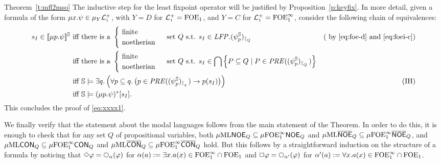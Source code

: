 \begin{proofof}{Theorem~\ref{t:mfl2mso}}
The inductive step for the least fixpoint operator will be justified by 
Proposition~\ref{p:keyfix}.
In more detail, given a formula of the form $\mu x. \psi \in\mu_{Y} \mathcal{L}_{\scriptscriptstyle 1}^{+}$, with $Y=D$ for $\mathcal{L}_{\scriptscriptstyle 1}^{+} =\mathrm{FOE}_1$, and $Y=C$ for $\mathcal{L}_{\scriptscriptstyle 1}^{+} =\mathrm{FOE}^{\infty}_1$, 
consider the following chain of equivalences:
\begin{align*}
s_{I} \in \mng{\mu p.\psi}^{\bbS} \text{ iff } &
   \text{there is a }\begin{cases} \text{ finite} & \\ \text{ noetherian} & \end{cases} \text{ set $Q$ s.t. } 
   s_{I} \in \LFP. (\psi^{\model}_{p})_{\rst{Q}} 
   & \text{( by \eqref{eq:foe-d} and \eqref{eq:foei-c})}
\\ \text{ iff } &
\text{there is a }\begin{cases} \text{ finite} & \\ \text{ noetherian} & \end{cases} \text{ set $Q$ s.t. } 
   s_{I} \in \bigcap \Big\{ P \subseteq Q \mid P \in 
   \PRE((\psi^{\model}_{p})_{\rst{Q}})\Big\} 
\\ \text{ iff } & 
    \bbS \models \exists q.\, \Big(\forall p \subseteq q.\,
       \big(p \in \PRE((\psi^{\model}_{p})_{\rst{q}}) \to p(s_{I})\big)
       \Big)
   & (\text{IH})
\\ \text{ iff } & 
    \bbS \models (\mu p. \psi)^{*}[s_{I}].
\end{align*}
This concludes the proof of \eqref{eq:xxxx1}.

We finally verify that the statement about the modal languages follows from the main statement of the Theorem.
In order to do this, it is enough to check that for any set $Q$ of propositional variables, both $\mu\mathrm{ML}\mathsf{NOE}_{Q}\subseteq\mu\mathrm{FOE}^{\infty}_1\mathsf{NOE}_{Q}$ and $\mu\mathrm{ML}\overline{\mathsf{NOE}}_{Q}\subseteq\mu\mathrm{FOE}^{\infty}_1\overline{\mathsf{NOE}}_{Q}$, and $\mu\mathrm{ML}\mathsf{CON}_{Q}\subseteq\mu\mathrm{FOE}^{\infty}_1\mathsf{CON}_{Q}$ and $\mu\mathrm{ML}\overline{\mathsf{CON}}_{Q}\subseteq\mu\mathrm{FOE}^{\infty}_1\overline{\mathsf{CON}}_{Q}$ hold. But this follows by a straightforward induction on the structure of a formula by noticing that $\Diamond \varphi = \nxt{\al}(\varphi)$ for $\alpha(a):=\exists x.a(x) \in \mathrm{FOE}^{\infty}_1 \cap \mathrm{FOE}_1$ and $\Box \varphi = \nxt{\al'}(\varphi)$ for $\alpha'(a):=\forall x.a(x) \in \mathrm{FOE}^{\infty}_1 \cap \mathrm{FOE}_1$.
\end{proofof}

